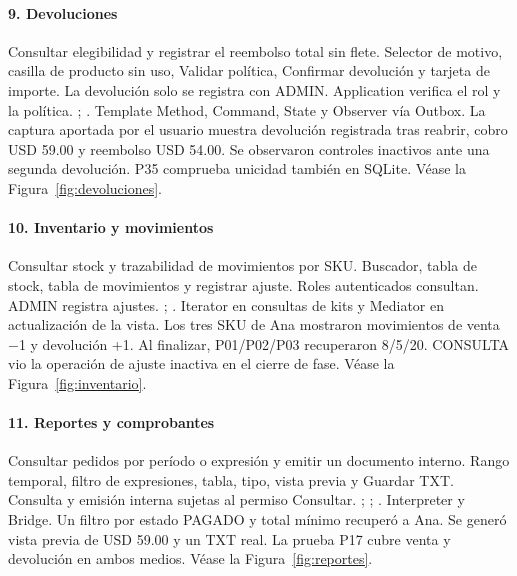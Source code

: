 \clearpage
\paragraph{9. Devoluciones}
 Consultar elegibilidad y registrar el reembolso total sin flete.
 Selector de motivo, casilla de producto sin uso, Validar política, Confirmar devolución y tarjeta de importe.
 La devolución solo se registra con ADMIN. Application verifica el rol y la política.
 ; .
 Template Method, Command, State y Observer vía Outbox.
 La captura aportada por el usuario muestra devolución registrada tras reabrir, cobro USD 59.00 y reembolso USD 54.00. Se observaron controles inactivos ante una segunda devolución. P35 comprueba unicidad también en SQLite. Véase la Figura~\ref{fig:devoluciones}.

\clearpage
\paragraph{10. Inventario y movimientos}
 Consultar stock y trazabilidad de movimientos por SKU.
 Buscador, tabla de stock, tabla de movimientos y registrar ajuste.
 Roles autenticados consultan. ADMIN registra ajustes.
 ; .
 Iterator en consultas de kits y Mediator en actualización de la vista.
 Los tres SKU de Ana mostraron movimientos de venta −1 y devolución +1. Al finalizar, P01/P02/P03 recuperaron 8/5/20. CONSULTA vio la operación de ajuste inactiva en el cierre de fase. Véase la Figura~\ref{fig:inventario}.

\clearpage
\paragraph{11. Reportes y comprobantes}
 Consultar pedidos por período o expresión y emitir un documento interno.
 Rango temporal, filtro de expresiones, tabla, tipo, vista previa y Guardar TXT.
 Consulta y emisión interna sujetas al permiso Consultar.
 ; ; .
 Interpreter y Bridge.
 Un filtro por estado PAGADO y total mínimo recuperó a Ana. Se generó vista previa de USD 59.00 y un TXT real. La prueba P17 cubre venta y devolución en ambos medios. Véase la Figura~\ref{fig:reportes}.

